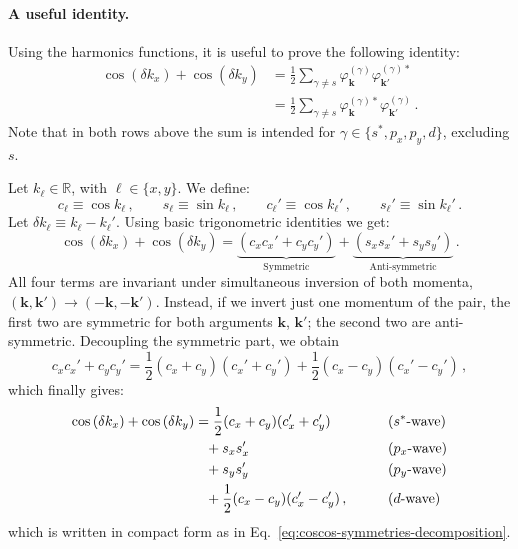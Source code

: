 \paragraph{A useful identity.}

Using the harmonics functions, it is useful to prove the following identity:
\begin{align} 
	\cos \left( \delta k_x \right)	+ \cos \left( \delta k_y  \right) &= \frac 1 2 \sum_{\gamma \neq s} \varphi_\mathbf{k}^{(\gamma)} \varphi_{\mathbf{k}'}^{(\gamma)*} \label{eq:coscos-symmetries-decomposition} \\
	&= \frac 1 2 \sum_{\gamma \neq s} \varphi_\mathbf{k}^{(\gamma)*} \varphi_{\mathbf{k}'}^{(\gamma)} \label{eq:coscos-symmetries-decomposition-variant} \, .
\end{align}
Note that in both rows above the sum is intended for $\gamma \in \lbrace s^*, p_x, p_y, d \rbrace$, excluding $s$.

\begin{tabproof}

	Let $k_\ell \in \mathbb{R}$, with $\ell \in \lbrace x, y \rbrace$. We define:
	\[
		c_\ell \equiv \cos k_\ell \, ,
		\qquad
		s_\ell \equiv \sin k_\ell \, ,
		\qquad
		c_\ell' \equiv \cos	k_\ell' \, ,
		\qquad
		s_\ell' \equiv \sin k_\ell' \, .
	\]
	Let $\delta k_\ell \equiv k_\ell - k_\ell'$. Using basic trigonometric identities we get:
	\begin{equation}\label{eq:sym-asym-couplings-gap}
		\cos \left( \delta k_x \right)	+ \cos \left( \delta k_y \right) = 
		\underbrace{
			\left(c_x c_x' + c_y c_y' \right) 
		}_\text{Symmetric}
		+ \underbrace{
			\left(s_x s_x' + s_y s_y' \right)
		}_\text{Anti-symmetric} \, .
	\end{equation}
	All four terms are invariant under simultaneous inversion of both momenta, $(\mathbf{k},\mathbf{k}') \to (-\mathbf{k},-\mathbf{k}')$. Instead, if we invert just one momentum of the pair, the first two are symmetric for both arguments $\mathbf{k}$, $\mathbf{k}'$; the second two are anti-symmetric. Decoupling the symmetric part, we obtain
	\[
		c_x c_x' + c_y c_y' = \frac{1}{2} (c_x + c_y)(c_x' + c_y') + \frac{1}{2} (c_x - c_y)(c_x' - c_y') \, ,
	\]
	which finally gives:
	\[
	\begin{aligned}
		\cos \left( \delta k_x \right)	+ \cos \left( \delta k_y  \right) &= \frac{1}{2}  (c_x + c_y)(c_x' + c_y') &&\qquad\text{($s^*$-wave)} \\
		&\hphantom{=}+ s_x s_x' &&\qquad\text{($p_x$-wave)} \\
		&\hphantom{=}+ s_y s_y' &&\qquad\text{($p_y$-wave)} \\
		&\hphantom{=}+ \frac{1}{2} (c_x - c_y)(c_x' - c_y') \, , &&\qquad\text{($d$-wave)}
	\end{aligned}
	\]
	which is written in compact form as in Eq.~\eqref{eq:coscos-symmetries-decomposition}.
\end{tabproof}

